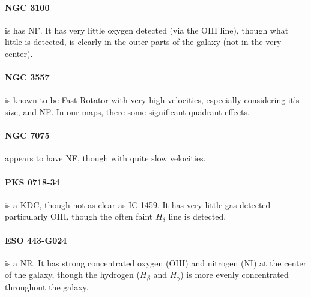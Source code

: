 \documentclass[a4paper,fleqn,usenatbib,useAMS]{mnras}
\begin{document}
	\paragraph{NGC 3100} is has NF. It has very little oxygen detected (via the OIII line), though what little is detected, is clearly in the outer parts of the galaxy (not in the very center).

	\paragraph{NGC 3557} is known to be Fast Rotator with very high velocities, especially considering it's size, and NF. In our maps, there some significant quadrant effects.

	\paragraph{NGC 7075} appears to have NF, though with quite slow velocities.

	\paragraph{PKS 0718-34} is a KDC, though not as clear as IC 1459. It has very little gas detected particularly OIII, though the often faint $H_\delta$ line is detected. 

	\paragraph{ESO 443-G024} is a NR. It has strong concentrated oxygen (OIII) and nitrogen (NI) at the center of the galaxy, though the hydrogen ($H_\beta$ and $H_\gamma$) is more evenly concentrated throughout the galaxy.
\end{document}
